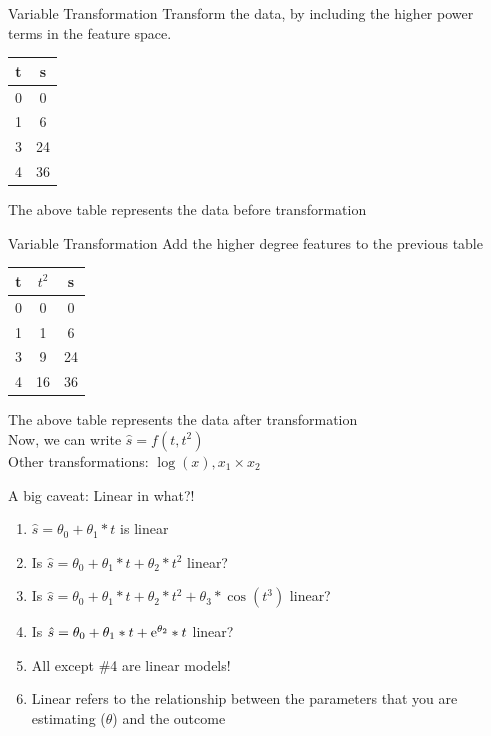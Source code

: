 \documentclass{beamer}
\begin{document}
\begin{frame}{Variable Transformation}
    Transform the data, by including the higher power terms in the feature space. 
    
       
    \begin{center}
 \begin{tabular}{||c c||} 
 \hline
 t  & s \\ [0.5ex] 
 \hline\hline
 0 & 0 \\
 1 & 6 \\
 3 & 24 \\
 4 & 36 \\
 \hline
\end{tabular}
\end{center}

The above table represents the data before transformation
\end{frame}


\begin{frame}{Variable Transformation}
Add the higher degree features to the previous table
    
       
    \begin{center}
 \begin{tabular}{||c c c||} 
 \hline
 t  & $t^{2}$ & s \\ [0.5ex] 
 \hline\hline
 0 & 0&0 \\
 1 & 1&6 \\
 3 & 9&24 \\
 4 & 16&36 \\
 \hline
\end{tabular}
\end{center}

\pause The above table represents the data after transformation \\
\pause Now, we can write $\hat{s}=f(t, t^2)$ \\
\pause Other transformations: $\log(x), x_1\times x_2$
\end{frame}

\begin{frame}{A big caveat: Linear in what?!\footnotemark}
\begin{enumerate}[<+->]
	\item $\hat{s}=\theta_0 + \theta_1*t$
	 is linear
	 \item Is $\hat{s}=\theta_0 + \theta_1*t + \theta_2*t^2$
	 linear?
	 \item Is $\hat{s}=\theta_0 + \theta_1*t + \theta_2*t^2 + \theta_3*\cos(t^3)$
	 linear?
	\item Is $\hat{s}=\theta_0 + \theta_1*t + {\rm e}^{\theta_2}*t$
	linear?
	\item All except \#4 are linear models! 
	\item Linear refers to the relationship between the parameters that you are estimating ($\theta$) and the outcome 
\end{enumerate}
\end{frame}
\end{document}
